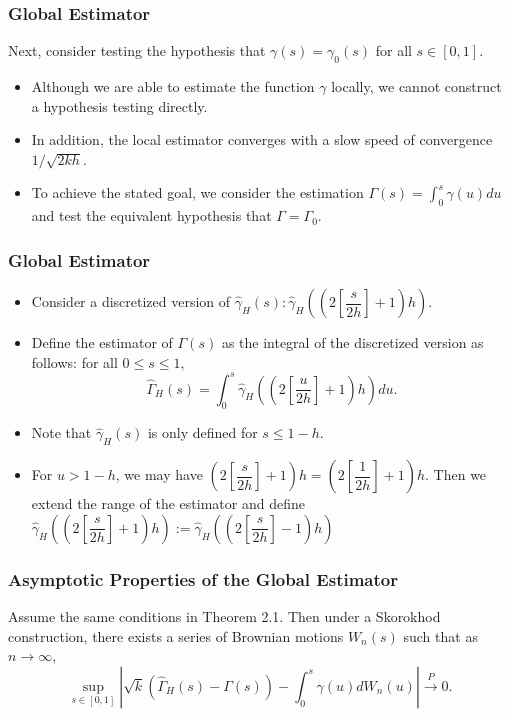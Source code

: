 \documentclass{beamer}
\newcommand{\suit}[1]{\left(#1\right)}
\begin{document}
\begin{frame}
    \frametitle{Global Estimator}
Next, consider testing the hypothesis that $\gamma(s)=\gamma_0(s)$ for all $s\in [0,1]$.

\bigskip

\begin{itemize}
    \item Although we are able to estimate the function $\gamma$ locally, we cannot construct a hypothesis testing directly.
    \item In addition, the local estimator converges with a slow speed of convergence $1/\sqrt{2kh}$.
    \item  To achieve the stated goal, we consider the estimation $\Gamma(s)=\int_{0}^{s}\gamma(u)du$ and test the equivalent hypothesis that $\Gamma=\Gamma_0$.
\end{itemize}
\end{frame}

\begin{frame}
    \frametitle{Global Estimator}

    \begin{itemize}
        \item      Consider a discretized version of $\hat{\gamma}_H(s): \hat{\gamma}_H\suit{(2[\dfrac{s}{2h}]+1)h}$.
        \smallskip
        \item      Define the estimator of $\Gamma(s)$ as the integral of the discretized version as follows: for all $0\le s\le 1$,
        $$
        \hat{\Gamma}_{H}(s)=\int_{0}^{s} \hat{\gamma}_{H}\left(\left(2\left[\frac{u}{2 h}\right]+1\right) h\right) d u.
        $$
        \smallskip
        \item Note that $\hat{\gamma}_H(s)$ is only defined for $s\le 1-h$.
        \smallskip
        \item For $u>1-h$, we may have $(2[\dfrac{s}{2h}]+1)h=(2[\dfrac{1}{2h}]+1)h$. Then we extend the range of the estimator and define $\hat{\gamma}_H((2[\dfrac{s}{2h}]+1)h):=\hat{\gamma}_H((2[\dfrac{s}{2h}]-1)h)$
    \end{itemize}


\end{frame}


\begin{frame}
    \frametitle{Asymptotic Properties of the Global Estimator}

    \begin{theorem}[2.2]
        Assume the same conditions in Theorem 2.1. Then under a Skorokhod  construction, there exists a series of Brownian motions $W_n(s)$ such that as $n \to \infty$,
$$
\sup _{s \in[0,1]}\left|\sqrt{k}\left(\hat{\Gamma}_{H}(s)-\Gamma(s)\right)-\int_{0}^{s} \gamma(u) d W_{n}(u)\right| \stackrel{P}{\rightarrow} 0.
$$
    \end{theorem}
    

\end{frame}
\end{document}
